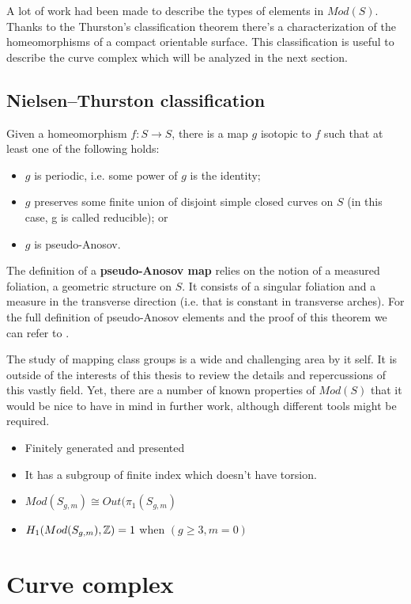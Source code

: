 A lot of work had been made to describe the types of elements in $Mod(S)$. Thanks to the Thurston's classification theorem there's a characterization of the homeomorphisms of a compact orientable surface. This classification is useful to describe the curve complex which will be analyzed in the next section.

\subsection{Nielsen–Thurston classification}
Given a homeomorphism $f: S \to  S$, there is a map $g$ isotopic to $f$ such that at least one of the following holds:

\begin{itemize}
\item $g$ is periodic, i.e. some power of $g$ is the identity;
\item $g$ preserves some finite union of disjoint simple closed curves on $S$ (in this case, g is called reducible); or
\item $g$ is pseudo-Anosov.
\end{itemize}

The definition of a \textbf{pseudo-Anosov map} relies on the notion of a measured foliation, a geometric structure on $S$. It consists of a singular foliation and a measure in the transverse direction (i.e. that is constant in transverse arches). For the full definition of pseudo-Anosov elements and the proof of this theorem we can refer to \cite[Farb, Chapter 13]{Farb}.

The study of mapping class groups is a wide and challenging area by it self. It is outside of the interests of this thesis to review the details and repercussions of this vastly field. Yet, there are a number of known properties of $Mod(S)$ that it would be nice to have in mind in further work, although different tools might be required.

\begin{itemize}
\item Finitely generated and presented
\item It has a subgroup of finite index which doesn't have torsion.
\item $Mod(S_{g,m}) \cong Out(\pi_{1}(S_{g,m})$
\item $H_{1}(Mod(S_{g,m}), \mathbb{Z}) = 1$ when $(g\geq3, m=0)$
\end{itemize}

\section{Curve complex}

